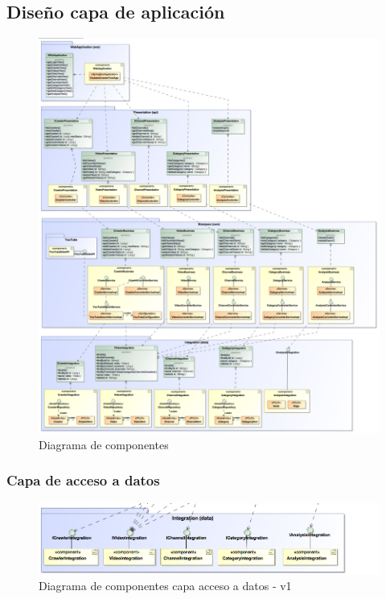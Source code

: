 \documentclass[11pt,a4paper]{article}
\begin{document}
\medskip 

\subsection{Diseño capa de aplicación}

\begin{figure}[H]
\centering
\includegraphics[scale=0.25]{diseno/ComponentDiagram3.png}
\caption{Diagrama de componentes}
\end{figure}

\medskip 

\subsubsection{Capa de acceso a datos}

\begin{figure}[H]
\centering
\includegraphics[scale=0.35]{diseno/accesoDatos/ComponentsDiagram.png}
\caption{Diagrama de componentes capa acceso a datos - v1}
\end{figure}
\end{document}
